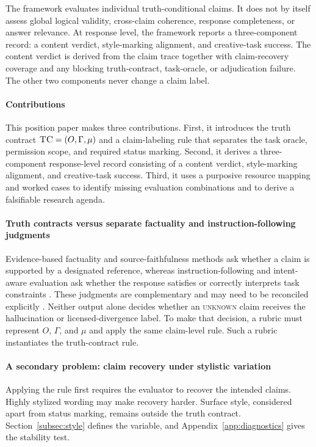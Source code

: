 \documentclass{clv2025}
\newcommand{\TC}{\textsc{TC}}
\begin{document}
The framework evaluates individual truth-conditional claims.
It does not by itself assess global logical validity, cross-claim coherence,
response completeness, or answer relevance.
At response level, the framework reports a three-component record: a content
verdict, style-marking alignment, and creative-task success. The content verdict
is derived from the claim trace together with claim-recovery coverage and any
blocking truth-contract, task-oracle, or adjudication failure. The other two
components never change a claim label.

\paragraph{Contributions}
This position paper makes three contributions.
First, it introduces the truth contract $\TC=(O,\Gamma,\mu)$ and a
claim-labeling rule that separates the task oracle, permission scope, and
required status marking.
Second, it derives a three-component response-level record consisting of a
content verdict, style-marking alignment, and creative-task success.
Third, it uses a purposive resource mapping and worked cases to identify missing
evaluation combinations and to derive a falsifiable research agenda.

\paragraph{Truth contracts versus separate factuality and instruction-following judgments}
Evidence-based factuality and source-faithfulness methods ask whether a claim
is supported by a designated reference, whereas instruction-following and
intent-aware evaluation ask whether the response satisfies or correctly
interprets task constraints
\citep{maynez_faithfulness_2020,min_factscore_2023,zhou_ifeval_2023,hao_faithqa_2025}.
These judgments are complementary and may need to be reconciled explicitly
\citep{wu_dancing_2024}. Neither output alone decides whether an
\textsc{unknown} claim receives the hallucination or licensed-divergence label.
To make that decision, a rubric must represent $O$, $\Gamma$, and $\mu$ and
apply the same claim-level rule. Such a rubric instantiates the truth-contract
rule.

\paragraph{A secondary problem: claim recovery under stylistic variation}
Applying the rule first requires the evaluator to recover the intended claims.
Highly stylized wording may make recovery harder. Surface style, considered
apart from status marking, remains outside the truth contract.
Section~\ref{subsec:style} defines the variable, and
Appendix~\ref{app:diagnostics} gives the stability test.
\end{document}
